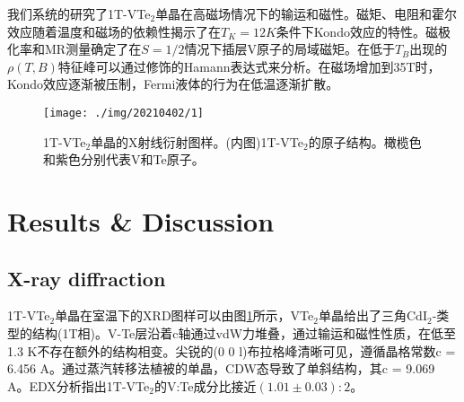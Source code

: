 \documentclass[reprint, aps, prb, showkeys]{revtex4-2}
\begin{document}
我们系统的研究了1T-VTe$_2$单晶在高磁场情况下的输运和磁性。磁矩、电阻和霍尔效应随着温度和磁场的依赖性揭示了在$T_K = 12 K$条件下Kondo效应的特性。磁极化率和MR测量确定了在$S = 1/2$情况下插层V原子的局域磁矩。在低于$T_B$出现的$\rho(T, B)$特征峰可以通过修饰的Hamann表达式来分析。在磁场增加到35T时，Kondo效应逐渐被压制，Fermi液体的行为在低温逐渐扩散。

\begin{figure}[t]
    \texttt{[image: ./img/20210402/1]}
    \caption{\label{fig:XRD} 
    1T-VTe$_2$单晶的X射线衍射图样。(内图)1T-VTe$_2$的原子结构。橄榄色和紫色分别代表V和Te原子。
    }
\end{figure}

\section{Results \& Discussion}
\subsection{X-ray diffraction}
1T-VTe$_2$单晶在室温下的XRD图样可以由图\ref{fig:XRD}所示，VTe$_2$单晶给出了三角CdI$_2$-类型的结构(1T相)。V-Te层沿着c轴通过vdW力堆叠，通过输运和磁性性质，在低至1.3 K不存在额外的结构相变。尖锐的(0 0 l)布拉格峰清晰可见，遵循晶格常数c = 6.456 A。通过蒸汽转移法植被的单晶，CDW态导致了单斜结构，其c = 9.069 A。EDX分析指出1T-VTe$_2$的V:Te成分比接近$(1.01 \pm 0.03) : 2$。
\end{document}
